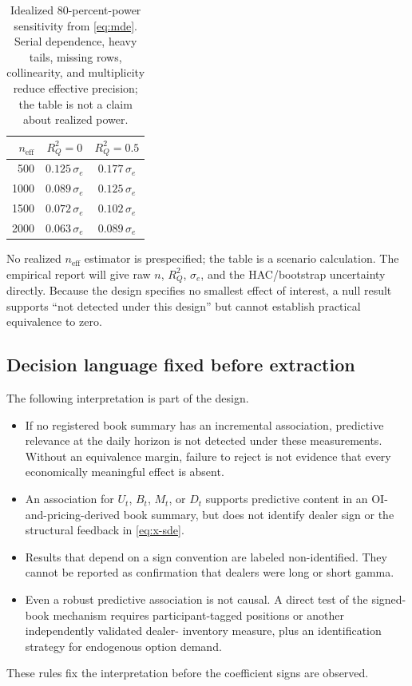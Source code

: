 \documentclass[11pt]{article}
\begin{document}
\begin{table}[!htbp]
\centering
\begin{tabular}{rcc}
\toprule
$n_{\mathrm{eff}}$ & $R_Q^2=0$ & $R_Q^2=0.5$\\
\midrule
500  & $0.125\,\sigma_e$ & $0.177\,\sigma_e$\\
1000 & $0.089\,\sigma_e$ & $0.125\,\sigma_e$\\
1500 & $0.072\,\sigma_e$ & $0.102\,\sigma_e$\\
2000 & $0.063\,\sigma_e$ & $0.089\,\sigma_e$\\
\bottomrule
\end{tabular}
\caption{Idealized 80-percent-power sensitivity from \cref{eq:mde}.  Serial dependence,
heavy tails, missing rows, collinearity, and multiplicity reduce effective precision; the
table is not a claim about realized power.}
\label{tab:mde}
\end{table}

No realized $n_{\mathrm{eff}}$ estimator is prespecified; the table is a scenario calculation.
The empirical report will give raw $n$, $R_Q^2$, $\sigma_e$, and the HAC/bootstrap
uncertainty directly.  Because the design specifies no smallest effect of interest, a null
result supports ``not detected under this design'' but cannot establish practical
equivalence to zero.

\subsection{Decision language fixed before extraction}

The following interpretation is part of the design.
\begin{itemize}
\item If no registered book summary has an incremental association, predictive relevance at
the daily horizon is not detected under these measurements.  Without an equivalence margin,
failure to reject is not evidence that every economically meaningful effect is absent.
\item An association for $U_t$, $B_t$, $M_t$, or $D_t$ supports predictive content in an
OI-and-pricing-derived book summary, but does not identify dealer sign or the structural
feedback in \eqref{eq:x-sde}.
\item Results that depend on a sign convention are labeled non-identified.  They cannot be
reported as confirmation that dealers were long or short gamma.
\item Even a robust predictive association is not causal.  A direct test of the signed-book
mechanism requires participant-tagged positions or another independently validated dealer-
inventory measure, plus an identification strategy for endogenous option demand.
\end{itemize}
These rules fix the interpretation before the coefficient signs are observed.
\end{document}
